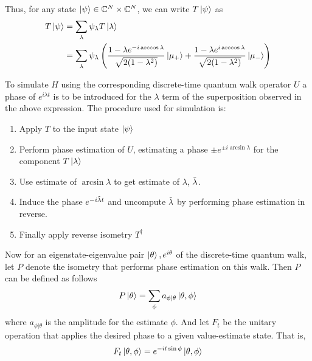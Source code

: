 \documentclass[
10pt, %
a4paper, %
oneside, %
headinclude,footinclude, %
BCOR5mm, %
]{scrartcl}
\begin{document}
Thus, for any state $\ket\psi\in\mathbb{C}^N\times\mathbb{C}^N$, we can write $T\ket\psi$ as
\begin{align*}
T\ket\psi&=\sum_\lambda \psi_\lambda T\ket\lambda\\
&=\sum_\lambda \psi_\lambda\left(\frac{1-\lambda e^{-i\arccos\lambda}}{\sqrt{2(1-\lambda^2)}}\ket{\mu_+}+\frac{1-\lambda e^{i\arccos\lambda}}{\sqrt{2(1-\lambda^2)}}\ket{\mu_-}\right)
\end{align*}

To simulate $H$ using the corresponding discrete-time quantum walk operator $U$ a phase of $e^{i\lambda t}$ is to be introduced for the $\lambda$ term of the superposition observed in the above expression. The procedure used for simulation is:
\begin{enumerate}
\item Apply $T$ to the input state $\ket\psi$
\item Perform phase estimation of $U$, estimating a phase $\pm e^{\pm i\arcsin\lambda}$ for the component $T\ket\lambda$
\item Use estimate of $\arcsin\lambda$ to get estimate of $\lambda$, $\Tilde{\lambda}$.
\item Induce the phase $e^{-i\Tilde{\lambda}t}$ and uncompute $\Tilde{\lambda}$ by performing phase estimation in reverse.
\item Finally apply reverse isometry $T^{\dagger}$
\end{enumerate}

Now for an eigenstate-eigenvalue pair $\ket\theta,e^{i\theta}$ of the discrete-time quantum walk, let $P$ denote the isometry that performs phase estimation on this walk. Then $P$ can be defined as follows
$$P\ket\theta=\sum_\phi a_{\phi|\theta}\ket{\theta,\phi}$$
where $a_{\phi|\theta}$ is the amplitude for the estimate $\phi$. And let $F_t$ be the unitary operation that applies the desired phase to a given value-estimate state. That is,
$$F_t\ket{\theta,\phi}=e^{-it\sin\phi}\ket{\theta,\phi}$$
\end{document}
